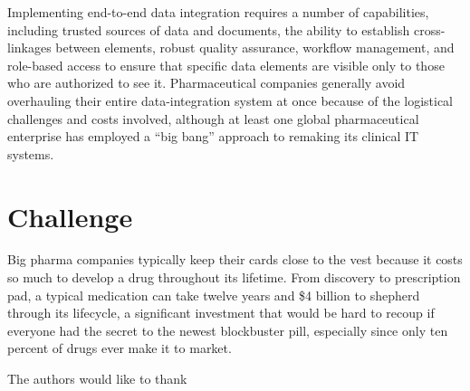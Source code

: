 \documentclass[sigconf]{acmart}
\begin{document}
Implementing end-to-end data integration requires a number of capabilities, including trusted sources of data and documents, the ability to establish cross-linkages between elements, robust quality assurance, workflow management, and role-based access to ensure that specific data elements are visible only to those who are authorized to see it. Pharmaceutical companies generally avoid overhauling their entire data-integration system at once because of the logistical challenges and costs involved, although at least one global pharmaceutical enterprise has employed a “big bang” approach to remaking its clinical IT systems.

\section{Challenge}
Big pharma companies typically keep their cards close to the vest because it costs so much to develop a drug throughout its lifetime.  From discovery to prescription pad, a typical medication can take twelve years and \$4 billion to shepherd through its lifecycle, a significant investment that would be hard to recoup if everyone had the secret to the newest blockbuster pill, especially since only ten percent of drugs ever make it to market.

\begin{acks}

  The authors would like to thank 

\end{acks}


 
\end{document}
